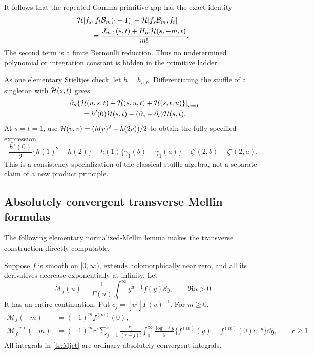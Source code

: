 It follows that the repeated-Gamma-primitive gap has the exact identity
\begin{align}
 &\mathcal H[f_s,f_t\mathcal B_m(\cdot+1)]
                 -\mathcal H[f_s\mathcal B_m,f_t]\notag\\
 &\qquad=\frac{J_{m,1}(s,t)+H_m\mathcal H(s,-m,t)}{m!}.
 \label{tr:balancedgap}
\end{align}
The second term is a finite Bernoulli reduction. Thus no undetermined
polynomial or integration constant is hidden in the primitive ladder.

As one elementary Stieltjes check, let $h=h_{a,b}$. Differentiating the
stuffle of a singleton with $\mathcal H(s,t)$ gives
\begin{align}
 &\left.\partial_u\{\mathcal H(u,s,t)+\mathcal H(s,u,t)+\mathcal H(s,t,u)\}\right|_{u=0}
 \notag\\
 &\qquad=h'(0)\mathcal H(s,t)-(\partial_s+\partial_t)\mathcal H(s,t).
 \label{tr:insertionderivative}
\end{align}
At $s=t=1$, use $\mathcal H(v,v)=(h(v)^2-h(2v))/2$ to obtain the fully
specified expression
\begin{equation}\label{tr:Stieltjesexample}
 \frac{h'(0)}2\{h(1)^2-h(2)\}
   +h(1)\{\gamma_1(b)-\gamma_1(a)\}
   +\zeta'(2,b)-\zeta'(2,a).
\end{equation}
This is a consistency specialization of the classical stuffle algebra,
not a separate claim of a new product principle.

\subsection{Absolutely convergent transverse Mellin formulas}

The following elementary normalized-Mellin lemma makes the transverse
construction directly computable.

\begin{lemma}
\label{tr:Mellinlemma}
Suppose $f$ is smooth on $[0,\infty)$, extends holomorphically near zero,
and all its derivatives decrease exponentially at infinity. Let
\[
 \mathcal M_f(u)=\frac1{\Gamma(u)}
                  \int_0^\infty y^{u-1}f(y)\dd y,\qquad\Re u>0.
\]
It has an entire continuation. Put $c_j=[v^j]\Gamma(v)^{-1}$.
For $m\geq0$,
\begin{align}
 \mathcal M_f(-m)&=(-1)^m f^{(m)}(0),\label{tr:Mvalue}\\
 \mathcal M_f^{(r)}(-m)
 &=(-1)^m r!\sum_{j=1}^r\frac{c_j}{(r-j)!}
      \int_0^\infty\frac{\log^{r-j}y}{y}
          \{f^{(m)}(y)-f^{(m)}(0)e^{-y}\}\dd y ,
 \qquad r\geq1.
 \label{tr:Mjet}
\end{align}
All integrals in \eqref{tr:Mjet} are ordinary absolutely convergent
integrals.
\end{lemma}

